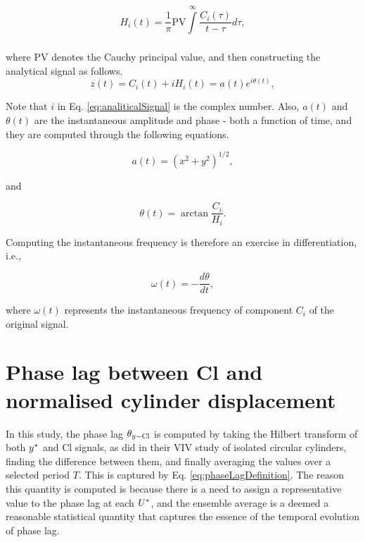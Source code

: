 \documentclass[oneside]{utmthesis}
\begin{document}
\begin{equation}
  H_{i} \left( t \right) = \frac{1}{\pi} \text{PV} \int\limits_{}^{\infty} \frac{C_{i} \left( \tau \right)}{t - \tau} d\tau,
  \label{eq:hilbertTransform}
\end{equation}

\noindent where PV denotes the Cauchy principal value, and then constructing the analytical signal as follows.
\begin{equation}
  z \left( t \right) = C_{i} \left( t \right) + i H_{i} \left( t \right) = a(t)e^{i\theta(t)},
  \label{eq:analiticalSignal}
\end{equation}

\noindent Note that $i$ in Eq. \ref{eq:analiticalSignal} is the complex number. Also, $a(t)$ and $\theta(t)$ are the instantaneous amplitude and phase - both a function of time, and they are computed through the following equations.

\begin{equation}
  a(t) = \left( x^{2} + y^{2} \right)^{1/2}, 
  \label{eq:instAmplitude}
\end{equation}

\noindent and

\begin{equation}
  \theta(t) = \arctan{\frac{C_{i}}{H_{i}}}.
  \label{eq:instPhase}
\end{equation}

\noindent Computing the instantaneous frequency is therefore an exercise in differentiation, i.e.,

\begin{equation}
  \omega(t) = - \frac{d\theta}{dt},
  \label{eq:instFrequency}
\end{equation}

\noindent where $\omega(t)$ represents the instantaneous frequency of component $C_{i}$ of the original signal.

\section{Phase lag between Cl and normalised cylinder displacement} \label{sec:phaseLag90}

In this study, the phase lag $\theta_{y-\text{Cl}}$ is computed by taking the Hilbert transform of both $y^{*}$ and Cl signals, as \citet{Khalak1999} did in their VIV study of isolated circular cylinders, finding the difference between them, and finally averaging the values over a selected period $T$. This is captured by Eq. \ref{eq:phaseLagDefinition}. The reason this quantity is computed is because there is a need to assign a representative value to the phase lag at each $U^{*}$, and the ensemble average is a deemed a reasonable statistical quantity that captures the essence of the temporal evolution of phase lag.
\end{document}
